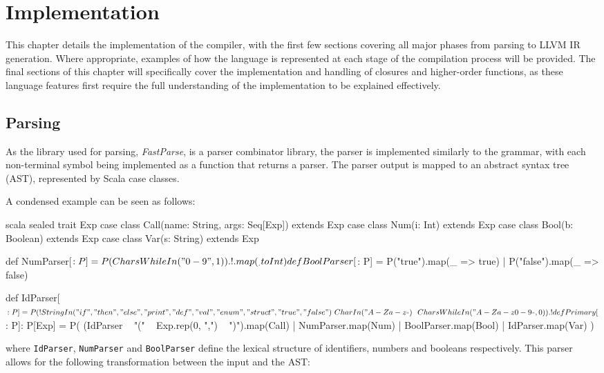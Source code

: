 \chapter{Implementation}

This chapter details the implementation of the compiler, with the first few sections covering all
major phases from parsing to LLVM IR generation. Where appropriate, examples of how the language is
represented at each stage of the compilation process will be provided. The final sections of this
chapter will specifically cover the implementation and handling of closures and higher-order
functions, as these language features first require the full understanding of the implementation to
be explained effectively.

\section{Parsing}

As the library used for parsing, \emph{FastParse}, is a parser combinator library, the parser is
implemented similarly to the grammar, with each non-terminal symbol being implemented as a function
that returns a parser. The parser output is mapped to an abstract syntax tree (AST), represented by
Scala case classes.

A condensed example can be seen as follows:

\begin{code}{scala}
    sealed trait Exp
    case class Call(name: String, args: Seq[Exp]) extends Exp
    case class Num(i: Int) extends Exp
    case class Bool(b: Boolean) extends Exp
    case class Var(s: String) extends Exp

    def NumParser[$: P] =
        P(CharsWhileIn("0-9", 1)).!.map(_.toInt)

    def BoolParser[$: P] =
        P("true").map(_ => true) |
        P("false").map(_ => false)

    def IdParser[$: P] = P(
        !StringIn("if", "then", "else", "print", "def", "val", "enum", "struct", "true", "false")
        ~ CharIn("A-Za-z_") ~~ CharsWhileIn("A-Za-z0-9_", 0)
    ).!

    def Primary[$: P]: P[Exp] = P(
        (IdParser ~ "(" ~ Exp.rep(0, ",") ~ ")").map(Call) |
        NumParser.map(Num) |
        BoolParser.map(Bool) |
        IdParser.map(Var)
    )
\end{code}

\noindent where \texttt{IdParser}, \texttt{NumParser} and \texttt{BoolParser} define the lexical
structure of identifiers, numbers and booleans respectively. This parser allows for the following
transformation between the input and the AST:

